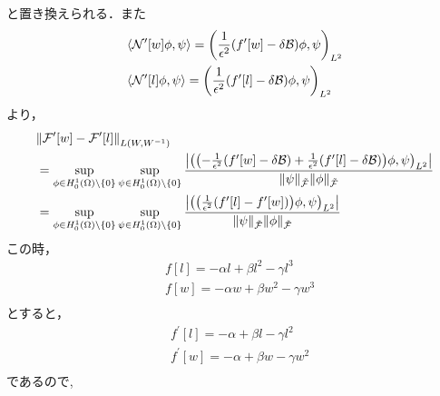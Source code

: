 と置き換えられる．また
\begin{align}
  &\langle \mathcal{N}'\qty[w]\phi,\psi \rangle =\qty(\frac{1}{\epsilon^2}\qty(f^\prime[w]-\delta \mathcal{B})\phi,\psi)_{L^2}\\
  &\langle \mathcal{N}'\qty[l]\phi,\psi \rangle =\qty(\frac{1}{\epsilon^2}\qty(f^\prime[l]-\delta \mathcal{B})\phi,\psi)_{L^2} 
\end{align}
より，
\begin{align}
  &\norm{\mathcal{F}'\qty[w]-\mathcal{F}'\qty[l]}_{L\qty(W,W^{-1})}\\
  &=
  \sup\limits_{\phi \in H^1_0(\Omega) \backslash \{ 0 \} }
  \sup\limits_{\psi \in H^1_0(\Omega) \backslash \{ 0 \} }
  \frac
  {\qty| \qty(\qty(-\frac{1}{\epsilon^2}\qty(f^\prime[w]-\delta \mathcal{B}) 
  + \frac{1}{\epsilon^2}\qty(f^\prime[l]-\delta \mathcal{B}))\phi,\psi)_{L^2} |}
  {\norm{\psi}_{\tilde{\mathcal{F}}}\norm{\phi}_{\tilde{\mathcal{F}}}}\\
  &=
  \sup\limits_{\phi \in H^1_0(\Omega) \backslash \{ 0 \} }
  \sup\limits_{\psi \in H^1_0(\Omega) \backslash \{ 0 \} }
  \frac
  {\qty| \qty(\qty(\frac{1}{\epsilon^2}\qty(f^\prime[l]-f^\prime[w]))\phi,\psi)_{L^2} |}
  {\norm{\psi}_{\tilde{\mathcal{F}}}\norm{\phi}_{\tilde{\mathcal{F}}}}\\
\end{align}
この時，
\begin{align}
  &f[l]=-\alpha l + \beta l^2 - \gamma l^3\\
  &f[w]=-\alpha w + \beta w^2 - \gamma w^3\\
\end{align}
とすると，
\begin{align}
  &f^\prime[l]=-\alpha  + \beta l - \gamma l^2\\
  &f^\prime[w]=-\alpha  + \beta w - \gamma w^2\\
\end{align}
であるので,
